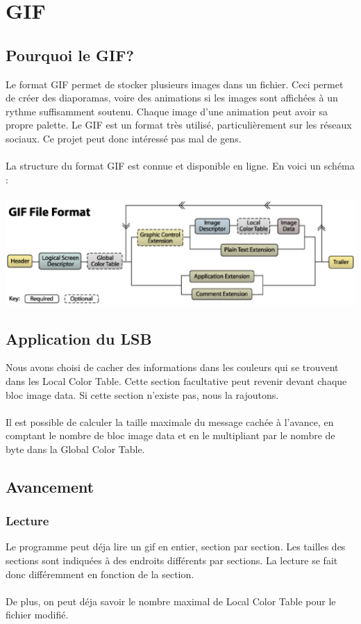 \section {GIF}
\subsection {Pourquoi le GIF?}
Le format GIF permet de stocker plusieurs images dans un fichier. Ceci permet de créer des diaporamas, voire des animations si les images sont affichées à un rythme suffisamment soutenu. Chaque image d'une animation peut avoir sa propre palette.
Le GIF est un format très utilisé, particulièrement sur les réseaux sociaux. Ce projet peut donc intéressé pas mal de gens. \\\\
La structure du format GIF est connue et disponible en ligne. En voici un schéma : \\\\
\includegraphics[width=15cm]{gif_structure.eps}
\subsection {Application du LSB}
Nous avons choisi de cacher des informations dans les couleurs qui se trouvent dans les Local Color Table. Cette section facultative peut revenir devant chaque bloc image data. Si cette section n'existe pas, nous la rajoutons.\\\\
Il est possible de calculer la taille maximale du message cachée à l'avance, en comptant le nombre de bloc image data et en le multipliant par le nombre de byte dans la Global Color Table.
\subsection {Avancement}
\subsubsection {Lecture}
Le programme peut déja lire un gif en entier, section par section. Les tailles des sections sont indiquées à des endroits différents par sections. La lecture se fait donc différemment en fonction de la section.\\\\
De plus, on peut déja savoir le nombre maximal de Local Color Table pour le fichier modifié.
